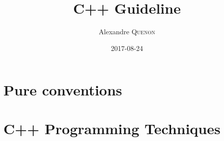\documentclass[a4paper,11pt]{scrbook}
\author{Alexandre \textsc{Quenon}}
\date{2017-08-24}%
\title{C++ Guideline}
\begin{document}
\frontmatter
\maketitle

\tableofcontents


\mainmatter

\part{Pure conventions}




\part{C++ Programming Techniques}


\backmatter
\printbibliography[heading=bibintoc]
\end{document}
